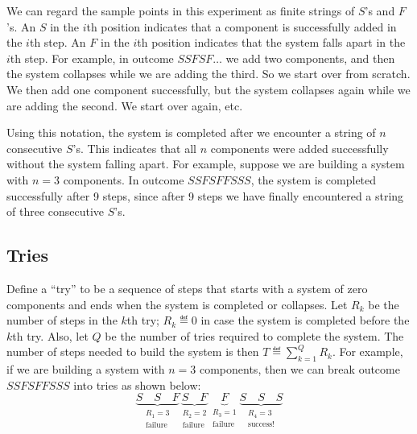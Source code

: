 \documentclass[11pt,twoside]{article}
\begin{document}
We can regard the sample points in this experiment as finite strings
of $S$'s and $F$'s.  An $S$ in the $i$th position indicates that a
component is successfully added in the $i$th step.  An $F$ in the
$i$th position indicates that the system falls apart in the $i$th
step.  For example, in outcome $SSFSF\ldots$ we add two components,
and then the system collapses while we are adding the third.  So we
start over from scratch.  We then add one component successfully, but
the system collapses again while we are adding the second.  We start
over again, etc.

Using this notation, the system is completed after we encounter a string
of $n$ consecutive $S$'s.  This indicates that all $n$ components were
added successfully without the system falling apart.  For example, suppose
we are building a system with $n=3$ components.  In outcome $SSFSFFSSS$,
the system is completed successfully after 9 steps, since after 9 steps we
have finally encountered a string of three consecutive $S$'s.

\subsection{Tries}

Define a ``try'' to be a sequence of steps that starts with a system
of zero components and ends when the system is completed or collapses.
Let $R_k$ be the number of steps in the $k$th try; $R_k \eqdef 0$ in case
the system is completed before the $k$th try.  Also, let $Q$ be the
number of tries required to complete the system.  The number of steps
needed to build the system is then $T \eqdef \sum_{k=1}^Q R_k$.  For
example, if we are building a system with $n = 3$ components, then we
can break outcome $SSFSFFSSS$ into tries as shown below:
\[
\underbrace{S \quad S \quad F}_{
        \begin{array}{c} R_1 = 3 \\ \text{failure} \end{array}}
\underbrace{S \quad F}_{
        \begin{array}{c} R_2 = 2 \\ \text{failure} \end{array}}
\underbrace{F}_{
        \begin{array}{c} R_3 = 1 \\ \text{failure} \end{array}}
\underbrace{S \quad S \quad S}_{
        \begin{array}{c} R_4 = 3 \\ \text{success!} \end{array}}
\]
\end{document}
